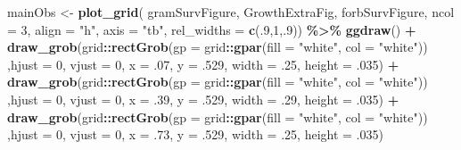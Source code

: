 \documentclass[
]{article}
\newenvironment{Shaded}{\begin{snugshade}}{\end{snugshade}}
\newcommand{\DataTypeTok}[1]{\textcolor[rgb]{0.13,0.29,0.53}{#1}}
\newcommand{\DecValTok}[1]{\textcolor[rgb]{0.00,0.00,0.81}{#1}}
\newcommand{\FloatTok}[1]{\textcolor[rgb]{0.00,0.00,0.81}{#1}}
\newcommand{\KeywordTok}[1]{\textcolor[rgb]{0.13,0.29,0.53}{\textbf{#1}}}
\newcommand{\NormalTok}[1]{#1}
\newcommand{\OperatorTok}[1]{\textcolor[rgb]{0.81,0.36,0.00}{\textbf{#1}}}
\newcommand{\StringTok}[1]{\textcolor[rgb]{0.31,0.60,0.02}{#1}}
\begin{document}
\begin{Shaded}
\begin{Highlighting}[]
\NormalTok{mainObs \textless{}{-}}\StringTok{ }\KeywordTok{plot\_grid}\NormalTok{( gramSurvFigure, GrowthExtraFig, forbSurvFigure, }\DataTypeTok{ncol =} \DecValTok{3}\NormalTok{, }\DataTypeTok{align =} \StringTok{"h"}\NormalTok{, }\DataTypeTok{axis =} \StringTok{"tb"}\NormalTok{, }\DataTypeTok{rel\_widths =} \KeywordTok{c}\NormalTok{(.}\DecValTok{9}\NormalTok{,}\DecValTok{1}\NormalTok{,.}\DecValTok{9}\NormalTok{)) }\OperatorTok{\%\textgreater{}\%}\StringTok{ }
\StringTok{  }\KeywordTok{ggdraw}\NormalTok{() }\OperatorTok{+}\StringTok{ }\KeywordTok{draw\_grob}\NormalTok{(grid}\OperatorTok{::}\KeywordTok{rectGrob}\NormalTok{(}\DataTypeTok{gp =}\NormalTok{ grid}\OperatorTok{::}\KeywordTok{gpar}\NormalTok{(}\DataTypeTok{fill =} \StringTok{"white"}\NormalTok{, }\DataTypeTok{col =} \StringTok{"white"}\NormalTok{)) ,}\DataTypeTok{hjust =} \DecValTok{0}\NormalTok{, }\DataTypeTok{vjust =} \DecValTok{0}\NormalTok{, }\DataTypeTok{x =} \FloatTok{.07}\NormalTok{, }\DataTypeTok{y =} \FloatTok{.529}\NormalTok{, }\DataTypeTok{width =} \FloatTok{.25}\NormalTok{, }\DataTypeTok{height =} \FloatTok{.035}\NormalTok{) }\OperatorTok{+}
\StringTok{  }\KeywordTok{draw\_grob}\NormalTok{(grid}\OperatorTok{::}\KeywordTok{rectGrob}\NormalTok{(}\DataTypeTok{gp =}\NormalTok{ grid}\OperatorTok{::}\KeywordTok{gpar}\NormalTok{(}\DataTypeTok{fill =} \StringTok{"white"}\NormalTok{, }\DataTypeTok{col =} \StringTok{"white"}\NormalTok{)) ,}\DataTypeTok{hjust =} \DecValTok{0}\NormalTok{, }\DataTypeTok{vjust =} \DecValTok{0}\NormalTok{, }\DataTypeTok{x =} \FloatTok{.39}\NormalTok{, }\DataTypeTok{y =} \FloatTok{.529}\NormalTok{, }\DataTypeTok{width =} \FloatTok{.29}\NormalTok{, }\DataTypeTok{height =} \FloatTok{.035}\NormalTok{) }\OperatorTok{+}
\StringTok{  }\KeywordTok{draw\_grob}\NormalTok{(grid}\OperatorTok{::}\KeywordTok{rectGrob}\NormalTok{(}\DataTypeTok{gp =}\NormalTok{ grid}\OperatorTok{::}\KeywordTok{gpar}\NormalTok{(}\DataTypeTok{fill =} \StringTok{"white"}\NormalTok{, }\DataTypeTok{col =} \StringTok{"white"}\NormalTok{)) ,}\DataTypeTok{hjust =} \DecValTok{0}\NormalTok{, }\DataTypeTok{vjust =} \DecValTok{0}\NormalTok{, }\DataTypeTok{x =} \FloatTok{.73}\NormalTok{, }\DataTypeTok{y =} \FloatTok{.529}\NormalTok{, }\DataTypeTok{width =} \FloatTok{.25}\NormalTok{, }\DataTypeTok{height =} \FloatTok{.035}\NormalTok{)}


\end{Highlighting}
\end{Shaded}
\end{document}

